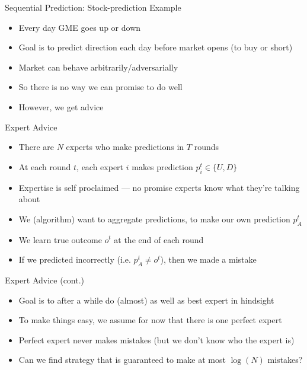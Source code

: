 \documentclass[11pt,aspectratio=169]{beamer}
\begin{document}
  \begin{frame}{Sequential Prediction: Stock-prediction Example}
   \begin{itemize}[<+->]
   \setlength{\itemsep}{1.2em}
    \item Every day GME goes \alert{up} or \alert{down}
    \item Goal is to predict direction each day before market opens (to buy or short)
    \item Market can behave arbitrarily/adversarially
    \item So there is no way we can promise to do \alert{well}
    \item However, we get \alert{advice}
   \end{itemize}
  \end{frame}
  
  
  \begin{frame}{Expert Advice}
   \begin{itemize}[<+->]
   \setlength{\itemsep}{1em}
    \item There are $N$ \alert{experts} who make predictions in $T$ rounds
    \item At each round $t$, each expert $i$ makes prediction $p_i^t \in \{U, D\}$
    \item Expertise is self proclaimed --- no promise experts know what they're talking about
    \item We (algorithm) want to aggregate predictions, to make our own prediction $p_A^t$
    \item We learn true outcome $o^t$ at the end of each round
    \item If we predicted incorrectly (i.e. $p_A^t \neq o^t$), then we \alert{made a mistake}
   \end{itemize}
  \end{frame}
  
  
  \begin{frame}{Expert Advice (cont.)}
   \begin{itemize}[<+->]
   \setlength{\itemsep}{1em}
    \item Goal is to after a while do (almost) as well as \alert{best} expert in hindsight
    \item To make things easy, we assume for now that there is one \alert{perfect} expert
    \item Perfect expert never makes mistakes (but we don't know who the expert is)
    \item Can we find strategy that is guaranteed to make at most $\log(N)$ mistakes?
   \end{itemize}
  \end{frame}
  
\end{document}
